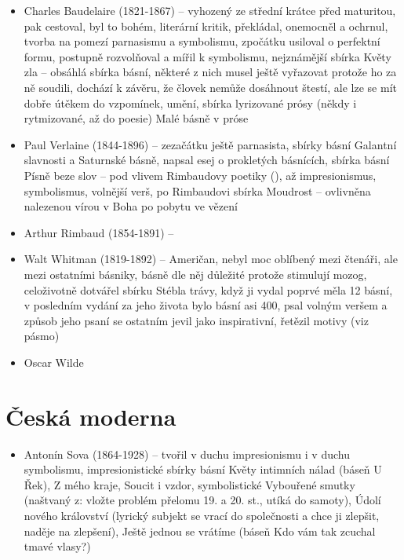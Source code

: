 \documentclass{article}
\begin{document}
\begin{itemize}
  \begin{itemize}
    \item Charles Baudelaire (1821-1867) -- vyhozený ze střední krátce před maturitou, pak cestoval, byl to bohém, literární kritik, překládal, onemocněl a ochrnul, tvorba na pomezí parnasismu a symbolismu, zpočátku usiloval o perfektní formu, postupně rozvolňoval a mířil k symbolismu, nejznámější sbírka Květy zla -- obsáhlá sbírka básní, některé z nich musel ještě vyřazovat protože ho za ně soudili, dochází k závěru, že človek nemůže dosáhnout štestí, ale lze se mít dobře útěkem do vzpomínek, umění, sbírka lyrizované prósy (někdy i rytmizované, až do poesie) Malé básně v próse
    \item Paul Verlaine (1844-1896) -- zezačátku ještě parnasista, sbírky básní Galantní slavnosti a Saturnské básně, napsal esej o prokletých básnících, sbírka básní Písně beze slov -- pod vlivem Rimbaudovy poetiky (), až impresionismus, symbolismus, volnější verš, po Rimbaudovi sbírka Moudrost -- ovlivněna nalezenou vírou v Boha po pobytu ve vězení
    \item Arthur Rimbaud (1854-1891) --
    \item Walt Whitman (1819-1892) -- Američan, nebyl moc oblíbený mezi čtenáři, ale mezi ostatními básniky, básně dle něj důležité protože stimulují mozog, celoživotně dotvářel sbírku Stébla trávy, když ji vydal poprvé měla 12 básní, v posledním vydání za jeho života bylo básní asi 400, psal volným veršem a způsob jeho psaní se ostatním jevil jako inspirativní, řetězil motivy (viz pásmo)
    \item Oscar Wilde
  \end{itemize}
\end{itemize}

\part{Česká moderna}
\begin{itemize}
  \item Antonín Sova (1864-1928) -- tvořil v duchu impresionismu i v duchu symbolismu, impresionistické sbírky básní Květy intimních nálad (báseň U Řek), Z mého kraje, Soucit i vzdor, symbolistické Vybouřené smutky (naštvaný z: vložte problém přelomu 19. a 20. st., utíká do samoty), Údolí nového království (lyrický subjekt se vrací do společnosti a chce ji zlepšit, naděje na zlepšení), Ještě jednou se vrátíme (báseň Kdo vám tak zcuchal tmavé vlasy?)
\end{itemize}
\end{document}
